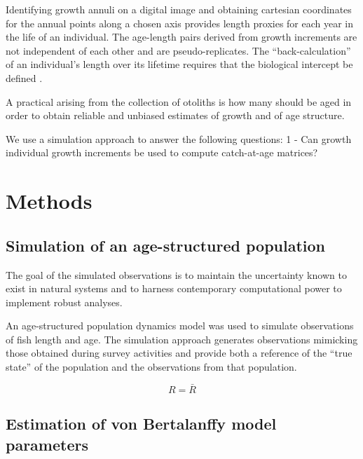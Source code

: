 \documentclass[preprint, 3p,
authoryear]{elsarticle} %
\begin{document}
Identifying growth annuli on a digital image and obtaining cartesian
coordinates for the annual points along a chosen axis provides length
proxies for each year in the life of an individual. The age-length pairs
derived from growth increments are not independent of each other and are
pseudo-replicates. The ``back-calculation'' of an individual's length
over its lifetime requires that the biological intercept be defined
\citep{Campana-1998-backcalculations}.

A practical arising from the collection of otoliths is how many should
be aged in order to obtain reliable and unbiased estimates of growth and
of age structure.

We use a simulation approach to answer the following questions: 1 - Can
growth individual growth increments be used to compute catch-at-age
matrices?

\hypertarget{methods}{%
\section{Methods}\label{methods}}

\hypertarget{simulation-of-an-age-structured-population}{%
\subsection{Simulation of an age-structured
population}\label{simulation-of-an-age-structured-population}}

The goal of the simulated observations is to maintain the uncertainty
known to exist in natural systems and to harness contemporary
computational power to implement robust analyses.

An age-structured population dynamics model was used to simulate
observations of fish length and age. The simulation approach generates
observations mimicking those obtained during survey activities and
provide both a reference of the ``true state'' of the population and the
observations from that population.

\begin{equation}
R = \bar{R}
\end{equation}

\hypertarget{estimation-of-von-bertalanffy-model-parameters}{%
\subsection{Estimation of von Bertalanffy model
parameters}\label{estimation-of-von-bertalanffy-model-parameters}}
\end{document}
